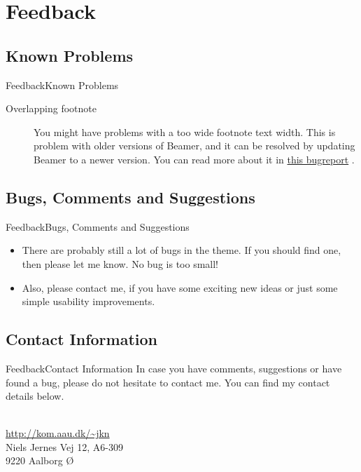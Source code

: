 \documentclass[10pt]{beamer}
\newcommand{\chref}[2]{%
  \href{#1}{{\usebeamercolor[bg]{AAUsidebar}#2}}%
}
\begin{document}
\section{Feedback}
\subsection{Known Problems}
\begin{frame}{Feedback}{Known Problems}
  \begin{description}
    \item[Overlapping footnote] You might have problems with a too wide footnote text width. This is problem with older versions of Beamer, and it can be resolved by updating Beamer to a newer version. You can read more about it in \chref{https://bitbucket.org/rivanvx/beamer/issue/200/width-of-footnote-in-a-sidebar-theme}{this bugreport}.
  \end{description}
\end{frame}

\subsection{Bugs, Comments and Suggestions}
\begin{frame}{Feedback}{Bugs, Comments and Suggestions}
  \begin{itemize}
    \item<1-> There are probably still a lot of bugs in the theme. If you should find one, then please let me know. No bug is too small!
    \item<2-> Also, please contact me, if you have some exciting new ideas or just some simple usability improvements.
  \end{itemize}
\end{frame}

\subsection{Contact Information}
\begin{frame}{Feedback}{Contact Information}
In case you have comments, suggestions or have found a bug, please do not hesitate to contact me. You can find my contact details below.
  \begin{center}
    \insertauthor\\
    \chref{http://kom.aau.dk/~jkn}{http://kom.aau.dk/\textasciitilde jkn}\\
    Niels Jernes Vej 12, A6-309\\
    9220 Aalborg Ø
  \end{center}
\end{frame}

{\aauwavesbg
\begin{frame}
\end{frame}}
\end{document}
